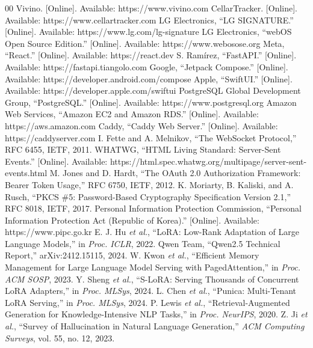 \documentclass[conference]{IEEEtran}
\begin{document}
\begin{thebibliography}{00}
 Vivino. [Online]. Available: https://www.vivino.com
 CellarTracker. [Online]. Available: https://www.cellartracker.com
 LG Electronics, ``LG SIGNATURE.'' [Online]. Available: https://www.lg.com/lg-signature
 LG Electronics, ``webOS Open Source Edition.'' [Online]. Available: https://www.webosose.org
 Meta, ``React.'' [Online]. Available: https://react.dev
 S. Ram\'irez, ``FastAPI.'' [Online]. Available: https://fastapi.tiangolo.com
 Google, ``Jetpack Compose.'' [Online]. Available: https://developer.android.com/compose
 Apple, ``SwiftUI.'' [Online]. Available: https://developer.apple.com/swiftui
 PostgreSQL Global Development Group, ``PostgreSQL.'' [Online]. Available: https://www.postgresql.org
 Amazon Web Services, ``Amazon EC2 and Amazon RDS.'' [Online]. Available: https://aws.amazon.com
 Caddy, ``Caddy Web Server.'' [Online]. Available: https://caddyserver.com
 I. Fette and A. Melnikov, ``The WebSocket Protocol,'' RFC 6455, IETF, 2011.
 WHATWG, ``HTML Living Standard: Server-Sent Events.'' [Online]. Available: https://html.spec.whatwg.org/multipage/server-sent-events.html
 M. Jones and D. Hardt, ``The OAuth 2.0 Authorization Framework: Bearer Token Usage,'' RFC 6750, IETF, 2012.
 K. Moriarty, B. Kaliski, and A. Rusch, ``PKCS \#5: Password-Based Cryptography Specification Version 2.1,'' RFC 8018, IETF, 2017.
 Personal Information Protection Commission, ``Personal Information Protection Act (Republic of Korea).'' [Online]. Available: https://www.pipc.go.kr
 E. J. Hu \textit{et al.}, ``LoRA: Low-Rank Adaptation of Large Language Models,'' in \textit{Proc. ICLR}, 2022.
 Qwen Team, ``Qwen2.5 Technical Report,'' arXiv:2412.15115, 2024.
 W. Kwon \textit{et al.}, ``Efficient Memory Management for Large Language Model Serving with PagedAttention,'' in \textit{Proc. ACM SOSP}, 2023.
 Y. Sheng \textit{et al.}, ``S-LoRA: Serving Thousands of Concurrent LoRA Adapters,'' in \textit{Proc. MLSys}, 2024.
 L. Chen \textit{et al.}, ``Punica: Multi-Tenant LoRA Serving,'' in \textit{Proc. MLSys}, 2024.
 P. Lewis \textit{et al.}, ``Retrieval-Augmented Generation for Knowledge-Intensive NLP Tasks,'' in \textit{Proc. NeurIPS}, 2020.
 Z. Ji \textit{et al.}, ``Survey of Hallucination in Natural Language Generation,'' \textit{ACM Computing Surveys}, vol. 55, no. 12, 2023.

\end{thebibliography}
\end{document}
